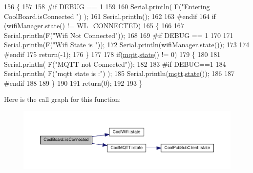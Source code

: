 \begin{DoxyCode}
156 \{
157 
158 \textcolor{preprocessor}{#if DEBUG == 1  }
159 
160     Serial.println( F(\textcolor{stringliteral}{"Entering CoolBoard.isConnected "}) );
161     Serial.println();
162 
163 \textcolor{preprocessor}{#endif}
164     \textcolor{keywordflow}{if} (\hyperlink{class_cool_board_acd88e6003606b47479ebba81e4aceeca}{wifiManager}.\hyperlink{class_cool_wifi_a1c7b4d82a4098d346e7593dce92039fa}{state}() != WL\_CONNECTED)
165     \{
166     
167         Serial.println(F(\textcolor{stringliteral}{"Wifi Not Connected"}));
168 
169 \textcolor{preprocessor}{    #if DEBUG == 1}
170 
171         Serial.println(F(\textcolor{stringliteral}{"Wifi State is "}));
172         Serial.println(\hyperlink{class_cool_board_acd88e6003606b47479ebba81e4aceeca}{wifiManager}.\hyperlink{class_cool_wifi_a1c7b4d82a4098d346e7593dce92039fa}{state}());
173         
174 \textcolor{preprocessor}{    #endif}
175         \textcolor{keywordflow}{return}(-1);
176     \}
177     
178     \textcolor{keywordflow}{if}(\hyperlink{class_cool_board_a2399f44d7c23c1149a335cb3b46d90f1}{mqtt}.\hyperlink{class_cool_m_q_t_t_a5d003307eff78efbd585e42b43b72b6d}{state}() != 0)
179     \{
180         
181         Serial.println( F(\textcolor{stringliteral}{"MQTT not Connected"}));
182 
183 \textcolor{preprocessor}{    #if DEBUG==1}
184         Serial.println( F(\textcolor{stringliteral}{"mqtt state is :"}) );
185         Serial.println(\hyperlink{class_cool_board_a2399f44d7c23c1149a335cb3b46d90f1}{mqtt}.\hyperlink{class_cool_m_q_t_t_a5d003307eff78efbd585e42b43b72b6d}{state}());  
186     
187 \textcolor{preprocessor}{    #endif}
188 
189     \}
190     
191     \textcolor{keywordflow}{return}(0);
192 
193 \}
\end{DoxyCode}
Here is the call graph for this function\+:\nopagebreak
\begin{figure}[H]
\begin{center}
\leavevmode
\includegraphics[width=350pt]{d7/df9/class_cool_board_ad7442cf4b62c7b0d5bd62a0f75ffc065_cgraph}
\end{center}
\end{figure}
\mbox{\label{class_cool_board_ae6b5e1274d760462290192acea4adca8}} 
